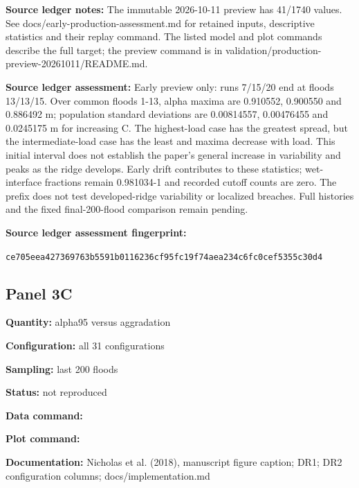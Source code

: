 \textbf{Source ledger notes:} The immutable 2026-10-11 preview has 41/\allowbreak{}1740 values. See docs/\allowbreak{}early-production-assessment.md for retained inputs, descriptive statistics and their replay command. The listed model and plot commands describe the full target; the preview command is in validation/\allowbreak{}production-preview-20261011/\allowbreak{}README.md.

\textbf{Source ledger assessment:} Early preview only: runs 7/\allowbreak{}15/\allowbreak{}20 end at floods 13/\allowbreak{}13/\allowbreak{}15. Over common floods 1-13, alpha maxima are 0.910552, 0.900550 and 0.886492 m; population standard deviations are 0.00814557, 0.00476455 and 0.0245175 m for increasing C. The highest-load case has the greatest spread, but the intermediate-load case has the least and maxima decrease with load. This initial interval does not establish the paper's general increase in variability and peaks as the ridge develops. Early drift contributes to these statistics; wet-interface fractions remain 0.981034-1 and recorded cutoff counts are zero. The prefix does not test developed-ridge variability or localized breaches. Full histories and the fixed final-200-flood comparison remain pending.

\textbf{Source ledger assessment fingerprint:}\par {\small\texttt{ce705eea427369763b5591b0116236cf95fc19f74aea234c6fc0cef5355c30d4}}\par

\subsection*{Panel 3C}
\textbf{Quantity:} alpha95 versus aggradation

\textbf{Configuration:} all 31 configurations

\textbf{Sampling:} last 200 floods

\textbf{Status:} not reproduced

\textbf{Data command:}\par {\small \texttt{}}\par

\textbf{Plot command:}\par {\small \texttt{}}\par

\textbf{Documentation:} Nicholas et al. (2018), manuscript figure caption; DR1; DR2 configuration columns; docs/\allowbreak{}implementation.md

